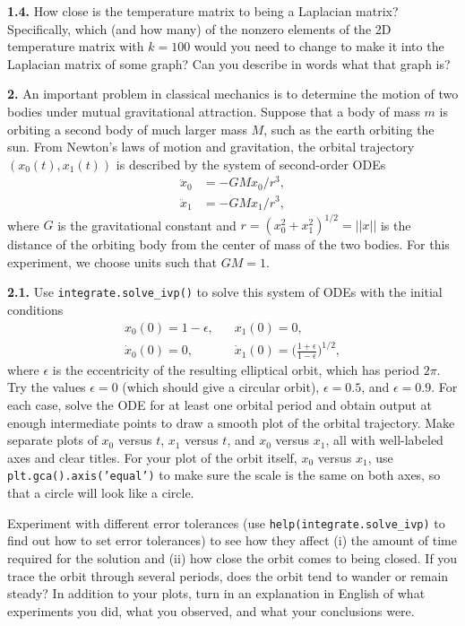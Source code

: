 \documentclass[11pt]{article}
\begin{document}
\par\medskip
{\bf 1.4.} 
How close is the temperature matrix to being a Laplacian matrix?
Specifically, which (and how many) of the nonzero elements of the 
2D temperature matrix with $k=100$ would you need to change to make 
it into the Laplacian matrix of some graph? 
Can you describe in words what that graph is?

\par\bigskip
{\bf 2.} 
An important problem in classical mechanics is to determine the motion
of two bodies under mutual gravitational attraction.
Suppose that a body of mass $m$ is orbiting a second body of much larger mass $M$,
such as the earth orbiting the sun.
From Newton's laws of motion and gravitation,
the orbital trajectory $(x_0(t), x_1(t))$ is described by the system
of second-order ODEs
\begin{align}
\ddot x_0 &= -GMx_0/r^3, \\
\ddot x_1 &= -GMx_1/r^3, 
\end{align}
where $G$ is the gravitational constant and $r = (x_0^2 + x_1^2)^{1/2} = ||x||$
is the distance of the orbiting body from the center of mass of the two bodies.
For this experiment, we choose units such that $GM=1$.

\par\medskip
{\bf 2.1.}
Use {\tt integrate.solve\_ivp()} to solve this system of ODEs with the initial conditions
\begin{align}
x_0(0)      = 1-\epsilon, & \;\;\; x_1(0)      = 0, \\
\dot x_0(0) = 0,   & \;\;\; \dot x_1(0) = \Big(\frac{1+\epsilon}{1-\epsilon}\Big)^{1/2},
\end{align}
where $\epsilon$ is the eccentricity of the resulting elliptical orbit,
which has period $2\pi$.
Try the values $\epsilon=0$ (which should give a circular orbit),
$\epsilon=0.5$, and $\epsilon=0.9$.
For each case, solve the ODE for at least one orbital period and obtain output 
at enough intermediate points to draw a smooth plot of the orbital trajectory.
Make separate plots of $x_0$ versus $t$, $x_1$ versus $t$, and $x_0$ versus $x_1$,
all with well-labeled axes and clear titles.
For your plot of the orbit itself, $x_0$ versus  $x_1$, 
use {\tt plt.gca().axis('equal')} to make sure the scale is the same on both axes,
so that a circle will look like a circle.

Experiment with different error tolerances 
(use {\tt help(integrate.solve\_ivp)} to find out how to set error tolerances)
to see how they affect 
(i)  the amount of time required for the solution and 
(ii) how close the orbit comes to being closed.
If you trace the orbit through several periods, 
does the orbit tend to wander or remain steady?
In addition to your plots, 
turn in an explanation in English of what experiments you did,
what you observed, and what your conclusions were.
\end{document}
